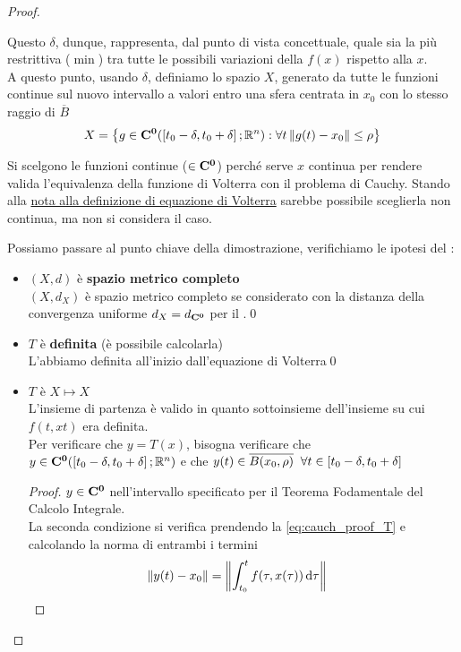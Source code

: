\begin{theorem}
\begin{proof}
\begin{itemize}
		\end{itemize}
		Questo $\delta$, dunque, rappresenta, dal punto di vista concettuale, quale sia la più restrittiva ($\min$) tra tutte le possibili variazioni della $f(x)$ rispetto alla $x$.\\
		A questo punto, usando $\delta$, definiamo lo spazio $X$, generato da tutte le funzioni continue sul nuovo intervallo a valori entro una sfera centrata in $x_0$ con lo stesso raggio di $\overline{B}$
		$$X = \left\{g\in \mathbf{C^{0}}(\left[t_0-\delta,t_0+\delta\right];\mathbb{R}^n):\forall t\left\|g(t)-x_0\right\|\leq \rho\right\}$$
		\begin{note}
			Si scelgono le funzioni continue ($\in \mathbf{C^{0}}$) perché serve $x$ continua per rendere valida l'equivalenza della funzione di Volterra con il problema di Cauchy. Stando alla \hyperlink{note:volterra_non_cont}{nota alla definizione di equazione di Volterra} sarebbe possibile sceglierla non continua, ma non si considera il caso.
		\end{note}
		Possiamo passare al punto chiave della dimostrazione, verifichiamo le ipotesi del :
		\begin{itemize}
			\item $(X,d)$ è \textbf{spazio metrico completo}\\
			$(X,d_X)$ è spazio metrico completo se considerato con la distanza della convergenza uniforme $d_X = d_{\mathbf{C^{0}}}$ per il .\qed
			\item $T$ è \textbf{definita} (è possibile calcolarla)\\
			L'abbiamo definita all'inizio dall'equazione di Volterra\qed
			\item $T$ è \boldmath$X\mapsto X$\unboldmath\\
			L'insieme di partenza è valido in quanto sottoinsieme dell'insieme su cui $f(t,xt)$ era definita.\\
			Per verificare che $y=T(x)$, bisogna verificare che $y\in \mathbf{C^{0}}(\left[t_0-\delta,t_0+\delta\right];\mathbb{R}^n)$ e che $y(t)\in \overline{B(x_0,\rho)}\;\;\forall t \in \left[t_0-\delta,t_0+\delta\right]$
			\begin{proof}
				$y\in \mathbf{C^{0}}$ nell'intervallo specificato per il Teorema Fodamentale del Calcolo Integrale.\\
				La seconda condizione si verifica prendendo la \cref{eq:cauch_proof_T} e calcolando la norma di entrambi i termini
				\begin{align*}
					\norm{y(t)-x_0} &= \norm{\int_{t_0}^t f(\tau,x(\tau))\integrald{\tau} }

\end{align*}
\end{proof}
\end{itemize}
\end{proof}
\end{theorem}
